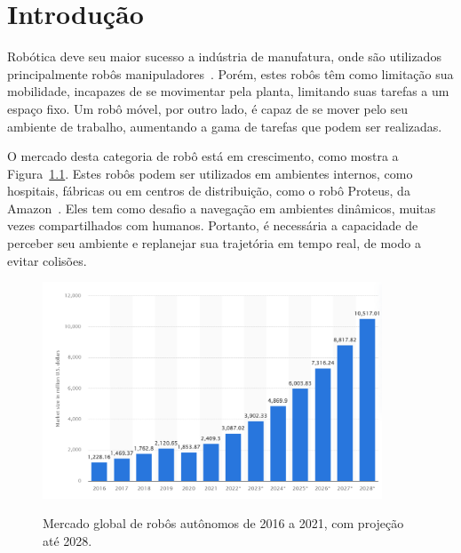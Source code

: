 \documentclass[repeatfields,xlists,xpacks,oneside,yearsonly]{ufrgscca}
\begin{document}

\tableofcontents

\chapter{Introdução}

Robótica deve seu maior sucesso a indústria de manufatura, onde são utilizados
principalmente robôs manipuladores~\cite{IntroductionToMobileRobots}.
Porém, estes robôs têm como limitação sua mobilidade, incapazes de se movimentar
pela planta, limitando suas tarefas a um espaço fixo.
Um robô móvel, por outro lado, é capaz de se mover pelo seu ambiente de
trabalho, aumentando a gama de tarefas que podem ser realizadas.

O mercado desta categoria de robô está em crescimento, como mostra a
Figura~\ref{fig:mercado_robo}.
Estes robôs podem ser utilizados em ambientes internos, como hospitais, fábricas
ou em centros de distribuição, como o robô Proteus, da Amazon~\cite{amazon_robot}.
Eles tem como desafio a navegação em ambientes dinâmicos, muitas vezes
compartilhados com humanos. Portanto, é necessária a capacidade
de perceber seu ambiente e replanejar sua trajetória em tempo real,
de modo a evitar colisões.

\begin{figure}[htbp]
    {
        \centering
        \caption{Mercado global de robôs autônomos de 2016 a 2021, com projeção até 2028.}
        \label{fig:mercado_robo}
        \includegraphics[width=0.9\textwidth]{mercado_robo}\\
    }
    {}
\end{figure}
\end{document}
